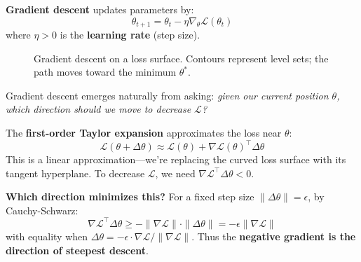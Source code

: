 \begin{definition}
    \textbf{Gradient descent} updates parameters by:
    \[
        \theta_{t+1} = \theta_t - \eta \nabla_\theta \mathcal{L}(\theta_t)
    \]
    where $\eta > 0$ is the \textbf{learning rate} (step size).
\end{definition}

\begin{figure}[h]
\centering
\caption{Gradient descent on a loss surface. Contours represent level sets; the path moves toward the minimum $\theta^*$.}
\end{figure}

\begin{remark}
    Gradient descent emerges naturally from asking: \emph{given our current position $\theta$, which direction should we move to decrease $\mathcal{L}$?}

    The \textbf{first-order Taylor expansion} approximates the loss near $\theta$:
    \[
        \mathcal{L}(\theta + \Delta\theta) \approx \mathcal{L}(\theta) + \nabla \mathcal{L}(\theta)^\top \Delta\theta
    \]
    This is a linear approximation---we're replacing the curved loss surface with its tangent hyperplane. To decrease $\mathcal{L}$, we need $\nabla \mathcal{L}^\top \Delta\theta < 0$.

    \textbf{Which direction minimizes this?} For a fixed step size $\|\Delta\theta\| = \epsilon$, by Cauchy-Schwarz:
    \[
        \nabla \mathcal{L}^\top \Delta\theta \geq -\|\nabla\mathcal{L}\| \cdot \|\Delta\theta\| = -\epsilon\|\nabla\mathcal{L}\|
    \]
    with equality when $\Delta\theta = -\epsilon \cdot \nabla\mathcal{L}/\|\nabla\mathcal{L}\|$. Thus the \textbf{negative gradient is the direction of steepest descent}.
\end{remark}

